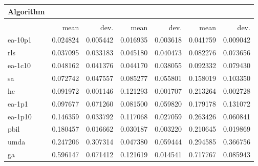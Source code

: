 \begin{tabular}{@{} l *{6}{>{{}}N{1}{2}} @{}}
\toprule
{Algorithm} &  \\
\midrule
&  &  &  \\
\midrule
& {mean} & {dev.} & {mean} & {dev.} & {mean} & {dev.} \\
\midrule
ea-10p1 & 0.024824 & 0.005442 & 0.016935 & 0.003618 & 0.041759 & 0.009042 \\
rls & 0.037095 & 0.033183 & 0.045180 & 0.040473 & 0.082276 & 0.073656 \\
ea-1c10 & 0.048162 & 0.041376 & 0.044170 & 0.038055 & 0.092332 & 0.079430 \\
sa & 0.072742 & 0.047557 & 0.085277 & 0.055801 & 0.158019 & 0.103350 \\
hc & 0.091972 & 0.001146 & 0.121293 & 0.001707 & 0.213264 & 0.002728 \\
ea-1p1 & 0.097677 & 0.071260 & 0.081500 & 0.059820 & 0.179178 & 0.131072 \\
ea-1p10 & 0.146359 & 0.033792 & 0.117068 & 0.027059 & 0.263426 & 0.060841 \\
pbil & 0.180457 & 0.016662 & 0.030187 & 0.003220 & 0.210645 & 0.019869 \\
umda & 0.247206 & 0.307314 & 0.047380 & 0.059444 & 0.294585 & 0.366756 \\
ga & 0.596147 & 0.071412 & 0.121619 & 0.014541 & 0.717767 & 0.085943 \\
\bottomrule
\end{tabular}
